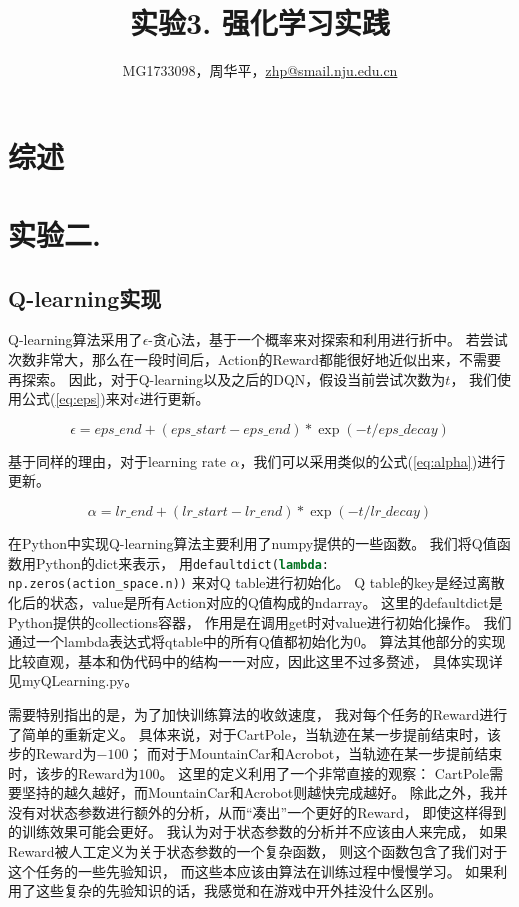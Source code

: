 \documentclass[a4paper,UTF8]{article}
\theoremstyle{definition}
\begin{document}
\title{实验3. 强化学习实践}
\author{MG1733098，周华平，\url{zhp@smail.nju.edu.cn}}
\maketitle

\section*{综述}


\section*{实验二.}

\subsection*{Q-learning实现}

Q-learning算法采用了$\epsilon$-贪心法，基于一个概率来对探索和利用进行折中。
若尝试次数非常大，那么在一段时间后，Action的Reward都能很好地近似出来，不需要再探索。
因此，对于Q-learning以及之后的DQN，假设当前尝试次数为$t$，
我们使用公式(\ref{eq:eps})来对$\epsilon$进行更新。

\begin{equation}
	\label{eq:eps}
	\epsilon = eps\_end+(eps\_start-eps\_end)*\exp(-t/eps\_decay)
\end{equation}

基于同样的理由，对于learning rate $\alpha$，我们可以采用类似的公式(\ref{eq:alpha})进行更新。

\begin{equation}
	\label{eq:alpha}
	\alpha = lr\_end+(lr\_start-lr\_end)*\exp(-t/lr\_decay)
\end{equation}

在Python中实现Q-learning算法主要利用了numpy提供的一些函数。
我们将Q值函数用Python的dict来表示，
用\lstinline[language=Python]{defaultdict(lambda: np.zeros(action_space.n))}
来对Q table进行初始化。
Q table的key是经过离散化后的状态，value是所有Action对应的Q值构成的ndarray。
这里的defaultdict是Python提供的collections容器，
作用是在调用get时对value进行初始化操作。
我们通过一个lambda表达式将qtable中的所有Q值都初始化为0。
算法其他部分的实现比较直观，基本和伪代码中的结构一一对应，因此这里不过多赘述，
具体实现详见myQLearning.py。

需要特别指出的是，为了加快训练算法的收敛速度，
我对每个任务的Reward进行了简单的重新定义。
具体来说，对于CartPole，当轨迹在某一步提前结束时，该步的Reward为$-100$；
而对于MountainCar和Acrobot，当轨迹在某一步提前结束时，该步的Reward为$100$。
这里的定义利用了一个非常直接的观察：
CartPole需要坚持的越久越好，而MountainCar和Acrobot则越快完成越好。
除此之外，我并没有对状态参数进行额外的分析，从而“凑出”一个更好的Reward，
即使这样得到的训练效果可能会更好。
我认为对于状态参数的分析并不应该由人来完成，
如果Reward被人工定义为关于状态参数的一个复杂函数，
则这个函数包含了我们对于这个任务的一些先验知识，
而这些本应该由算法在训练过程中慢慢学习。
如果利用了这些复杂的先验知识的话，我感觉和在游戏中开外挂没什么区别。
\end{document}
